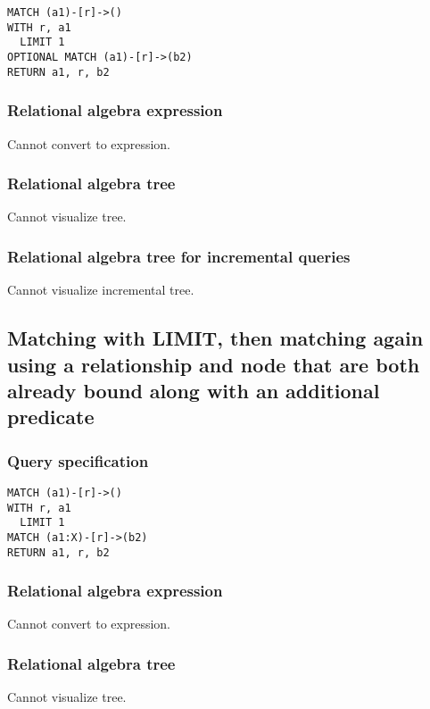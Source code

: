 \begin{lstlisting}
MATCH (a1)-[r]->()
WITH r, a1
  LIMIT 1
OPTIONAL MATCH (a1)-[r]->(b2)
RETURN a1, r, b2
\end{lstlisting}

\subsubsection*{Relational algebra expression}

Cannot convert to expression.

\subsubsection*{Relational algebra tree}

Cannot visualize tree.

\subsubsection*{Relational algebra tree for incremental queries}

Cannot visualize incremental tree.

\subsection{Matching with LIMIT, then matching again using a relationship and node that are both already bound along with an additional predicate}

\subsubsection*{Query specification}

\begin{lstlisting}
MATCH (a1)-[r]->()
WITH r, a1
  LIMIT 1
MATCH (a1:X)-[r]->(b2)
RETURN a1, r, b2
\end{lstlisting}

\subsubsection*{Relational algebra expression}

Cannot convert to expression.

\subsubsection*{Relational algebra tree}

Cannot visualize tree.

